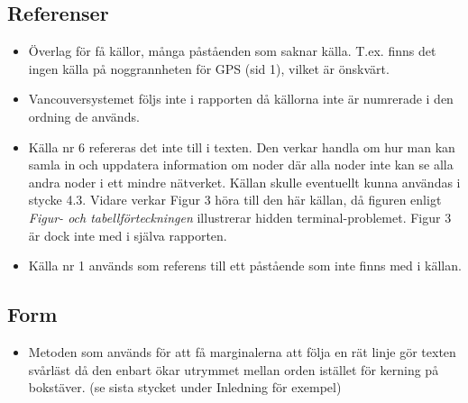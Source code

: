 \documentclass[a4paper,11pt]{article}
\begin{document}
\subsection{Referenser}

\begin{itemize}
   \item Överlag för få källor, många påståenden som saknar källa. T.ex. finns det ingen källa på noggrannheten för GPS (sid 1), vilket är önskvärt.
   \item Vancouversystemet följs inte i rapporten då källorna inte är numrerade i den ordning de används.
   \item Källa nr 6 refereras det inte till i texten. Den verkar handla om hur man kan samla in och uppdatera information om noder där alla noder inte kan se alla andra noder i ett mindre nätverket. Källan skulle eventuellt kunna användas i stycke 4.3. Vidare verkar Figur 3 höra till den här källan, då figuren enligt \emph{Figur- och tabellförteckningen} illustrerar hidden terminal-problemet. Figur 3 är dock inte med i själva rapporten.
   \item Källa nr 1 används som referens till ett påstående som inte finns med i källan.
\end{itemize}

\subsection{Form}

\begin{itemize}
   \item Metoden som används för att få marginalerna att följa en rät linje gör texten svårläst då den enbart ökar utrymmet mellan orden istället för kerning på bokstäver. (se sista stycket under Inledning för exempel)
\end{itemize}
\end{document}
